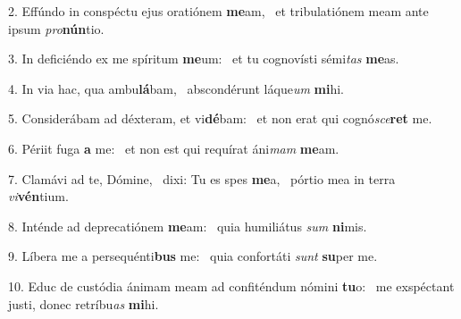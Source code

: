 2. Effúndo in conspéctu ejus oratiónem \textbf{me}am, \ast\  et tribulatiónem meam ante ipsum \textit{pro}\textbf{nún}tio.\

3. In deficiéndo ex me spíritum \textbf{me}um: \ast\  et tu cognovísti sémi\textit{tas} \textbf{me}as.\

4. In via hac, qua ambu\textbf{lá}bam, \ast\  abscondérunt láque\textit{um} \textbf{mi}hi.\

5. Considerábam ad déxteram, et vi\textbf{dé}bam: \ast\  et non erat qui cognó\textit{sce}\textbf{ret} me.\

6. Périit fuga \textbf{a} me: \ast\  et non est qui requírat áni\textit{mam} \textbf{me}am.\

7. Clamávi ad te, Dómine, \dag\  dixi: Tu es spes \textbf{me}a, \ast\  pórtio mea in terra \textit{vi}\textbf{vén}tium.\

8. Inténde ad deprecatiónem \textbf{me}am: \ast\  quia humiliátus \textit{sum} \textbf{ni}mis.\

9. Líbera me a persequénti\textbf{bus} me: \ast\  quia confortáti \textit{sunt} \textbf{su}per me.\

10. Educ de custódia ánimam meam ad confiténdum nómini \textbf{tu}o: \ast\  me exspéctant justi, donec retríbu\textit{as} \textbf{mi}hi.\

